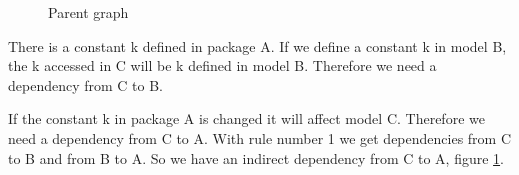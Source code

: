 \documentclass{cslthse-msc}
\begin{document}
\begin{figure}[H]
    \centering
    \qquad
    \subfloat{{}}
    \caption{Parent graph}
    \label{fig:parentGraph}
\end{figure}

There is a constant k defined in package A. If we define a constant k in model B, the k accessed in C will be k defined in model B. Therefore we need a dependency from C to B.

If the constant k in package A is changed it will affect model C. Therefore we need a dependency from C to A. With rule number 1 we get dependencies from C to B and from B to A. So we have an indirect dependency from C to A, figure \ref{fig:parentGraph}.
\end{document}
